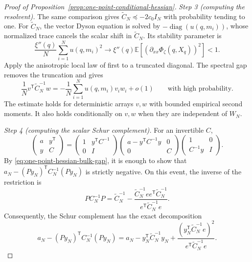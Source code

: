\documentclass[a4paper,10pt,reqno]{amsart}
\numberwithin{equation}{section}
\newcommand{\dE}{\mathbb{E}}%
\begin{document}
\begin{proof}[Proof of Proposition~\ref{prop:one-point-conditional-hessian}]
		\medskip\noindent\emph{Step 3 (computing the resolvent).}
		The same comparison gives
		\(\widetilde C_N\preceq-2c_0I_N\) with probability tending to one.
		For \(\widetilde C_N\), the vector Dyson equation is solved by
		\(-\operatorname{diag}(u(q,m_i))\), whose normalized trace cancels the
		scalar shift in \(\widetilde C_N\). Its stability parameter is
		\[
		\frac{\xi''(q)}N\sum_{i=1}^Nu(q,m_i)^2
		\longrightarrow
		\xi''(q)\dE\left[
		\left(\partial_{xx}\Phi_\zeta(q,X_q)\right)^2
		\right]<1.
		\]
		Apply the anisotropic local law of \cite{KnowlesYin} first to a
		truncated diagonal. The spectral gap removes the truncation and gives
		\begin{equation}\label{eq:one-point-anisotropic-resolvent}
			\frac1N v^{\mathsf T}\widetilde C_N^{-1}w
			=-\frac1N\sum_{i=1}^Nu(q,m_i)v_iw_i+o(1)
			\qquad\text{with high probability}.
		\end{equation}
		The estimate holds for deterministic arrays \(v,w\) with bounded
		empirical second moments. It also holds conditionally on \(v,w\) when
		they are independent of \(W_N\).
		
		\medskip\noindent\emph{Step 4 (computing the scalar Schur complement).}
		For an invertible \(C\),
		\begin{equation}
			\begin{pmatrix}a&y^{\mathsf T}\\y&C\end{pmatrix}
			=
			\begin{pmatrix}1&y^{\mathsf T}C^{-1}\\0&I\end{pmatrix}
			\begin{pmatrix}a-y^{\mathsf T}C^{-1}y&0\\0&C\end{pmatrix}
			\begin{pmatrix}1&0\\C^{-1}y&I\end{pmatrix}.
		\end{equation}
		By \eqref{eq:one-point-hessian-bulk-gap}, it is enough to show that
		\(a_N-(Py_N)^{\mathsf T}C_N^{-1}(Py_N)\) is strictly negative.
		On this event, the inverse of the restriction is
		\[
		PC_N^{-1}P
		=
		\widetilde C_N^{-1}
		-\frac{
			\widetilde C_N^{-1}ee^{\mathsf T}\widetilde C_N^{-1}
		}{
			e^{\mathsf T}\widetilde C_N^{-1}e
		}.
		\]
		Consequently, the Schur complement has the exact decomposition
		\begin{equation}\label{eq:one-point-schur-decomposition}
			a_N-(Py_N)^{\mathsf T}C_N^{-1}(Py_N)
			=
			a_N-y_N^{\mathsf T}\widetilde C_N^{-1}y_N
			+\frac{
				\left(y_N^{\mathsf T}\widetilde C_N^{-1}e\right)^2
			}{
				e^{\mathsf T}\widetilde C_N^{-1}e
			}.
		\end{equation}
		

\end{proof}
\end{document}
